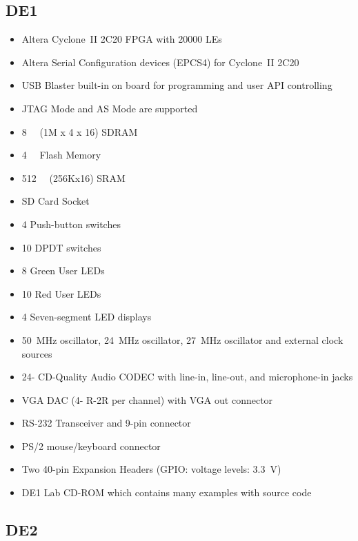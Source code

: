 \documentclass[12pt, logo=tehranDLDL/ut]{tehranDLDL}
\begin{document}
\subsection{DE1}

\begin{multicols}{2}
\begin{itemize}
    \item Altera Cyclone~II 2C20 FPGA with 20000 LEs
    \item Altera Serial Configuration devices (EPCS4) for Cyclone~II 2C20
    \item USB Blaster built-in on board for programming and user API controlling
    \item JTAG Mode and AS Mode are supported
    \item \SI{8}{\mega\byte} (1M x 4 x 16) SDRAM
    \item \SI{4}{\mega\byte} Flash Memory
    \item \SI{512}{\kilo\byte} (256Kx16) SRAM
    \item SD Card Socket
    \item 4 Push-button switches
    \item 10 DPDT switches
    \item 8 Green User LEDs
    \item 10 Red User LEDs
    \item 4 Seven-segment LED displays
    \item \SI{50}{\mega\hertz} oscillator, \SI{24}{\mega\hertz} oscillator, \SI{27}{\mega\hertz} oscillator and external clock sources
    \item 24-\SI{}{\bit} CD-Quality Audio CODEC with line-in, line-out, and microphone-in jacks
    \item VGA DAC (4-\SI{}{\bit} R-2R per channel) with VGA out connector
    \item RS-232 Transceiver and 9-pin connector
    \item PS/2 mouse/keyboard connector
    \item Two 40-pin Expansion Headers (GPIO: voltage levels: \SI{3.3}{\volt})
    \item DE1 Lab CD-ROM which contains many examples with source code
\end{itemize}
\end{multicols}

\subsection{DE2}
\end{document}
